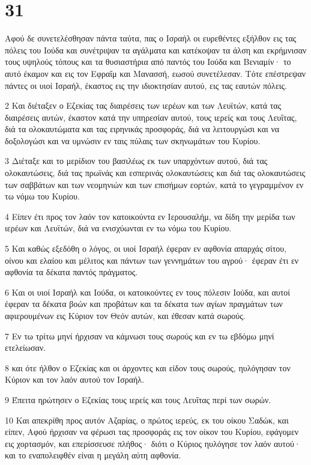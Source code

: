 \chapter{31}

\par Αφού δε συνετελέσθησαν πάντα ταύτα, πας ο Ισραήλ οι ευρεθέντες εξήλθον εις τας πόλεις του Ιούδα και συνέτριψαν τα αγάλματα και κατέκοψαν τα άλση και εκρήμνισαν τους υψηλούς τόπους και τα θυσιαστήρια από παντός του Ιούδα και Βενιαμίν· το αυτό έκαμον και εις τον Εφραΐμ και Μανασσή, εωσού συνετέλεσαν. Τότε επέστρεψαν πάντες οι υιοί Ισραήλ, έκαστος εις την ιδιοκτησίαν αυτού, εις τας εαυτών πόλεις.
\par 2 Και διέταξεν ο Εζεκίας τας διαιρέσεις των ιερέων και των Λευϊτών, κατά τας διαιρέσεις αυτών, έκαστον κατά την υπηρεσίαν αυτού, τους ιερείς και τους Λευΐτας, διά τα ολοκαυτώματα και τας ειρηνικάς προσφοράς, διά να λειτουργώσι και να δοξολογώσι και να υμνώσιν εν ταις πύλαις των σκηνωμάτων του Κυρίου.
\par 3 Διέταξε και το μερίδιον του βασιλέως εκ των υπαρχόντων αυτού, διά τας ολοκαυτώσεις, διά τας πρωϊνάς και εσπερινάς ολοκαυτώσεις και διά τας ολοκαυτώσεις των σαββάτων και των νεομηνιών και των επισήμων εορτών, κατά το γεγραμμένον εν τω νόμω του Κυρίου.
\par 4 Είπεν έτι προς τον λαόν τον κατοικούντα εν Ιερουσαλήμ, να δίδη την μερίδα των ιερέων και Λευϊτών, διά να ενισχύωνται εν τω νόμω του Κυρίου.
\par 5 Και καθώς εξεδόθη ο λόγος, οι υιοί Ισραήλ έφεραν εν αφθονία απαρχάς σίτου, οίνου και ελαίου και μέλιτος και πάντων των γεννημάτων του αγρού· έφεραν έτι εν αφθονία τα δέκατα παντός πράγματος.
\par 6 Και οι υιοί Ισραήλ και Ιούδα, οι κατοικούντες εν τους πόλεσιν Ιούδα, και αυτοί έφεραν τα δέκατα βοών και προβάτων και τα δέκατα των αγίων πραγμάτων των αφιερουμένων εις Κύριον τον Θεόν αυτών, και έθεσαν κατά σωρούς.
\par 7 Εν τω τρίτω μηνί ήρχισαν να κάμνωσι τους σωρούς και εν τω εβδόμω μηνί ετελείωσαν.
\par 8 και ότε ήλθον ο Εζεκίας και οι άρχοντες και είδον τους σωρούς, ηυλόγησαν τον Κύριον και τον λαόν αυτού τον Ισραήλ.
\par 9 Έπειτα ηρώτησεν ο Εζεκίας τους ιερείς και τους Λευΐτας περί των σωρών.
\par 10 Και απεκρίθη προς αυτόν Αζαρίας, ο πρώτος ιερεύς, εκ του οίκου Σαδώκ, και είπεν, Αφού ήρχισαν να φέρωσι τας προσφοράς εις τον οίκον του Κυρίου, εφάγομεν εις χορτασμόν, και επερίσσευσε πλήθος· διότι ο Κύριος ηυλόγησε τον λαόν αυτού· και το εναπολειφθέν είναι η μεγάλη αύτη αφθονία.
